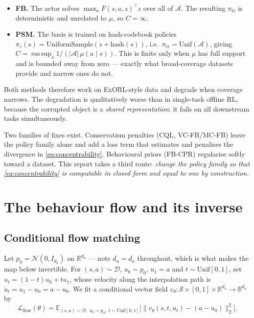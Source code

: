 \documentclass[11pt]{article}
\theoremstyle{plain}
\theoremstyle{definition}
\theoremstyle{remark}
\newcommand{\Sspace}{\mathcal S}
\newcommand{\Aspace}{\mathcal A}
\newcommand{\D}{\mathcal D}
\newcommand{\R}{\mathbb R}
\newcommand{\E}{\mathbb E}
\newcommand{\1}{\mathbf 1}
\begin{document}
\begin{itemize}
\item \textbf{FB.} The actor solves $\max_a F(s,a,z)^\top z$ over all of $\Aspace$. The
  resulting $\pi_{\mathrm{tr}}$ is deterministic and unrelated to $\mu$, so
  $C=\infty$.
\item \textbf{PSM.} The basis is trained on hash-codebook policies
  $\pi_z(s)=\mathrm{UniformSample}(z+\mathrm{hash}(s))$, i.e.\
  $\pi_{\mathrm{tr}}=\mathrm{Unif}(\Aspace)$, giving
  $C=\operatorname*{ess\,sup}_a 1/(|\Aspace|\,\mu(a\mid s))$. This is finite only when
  $\mu$ has full support and is bounded away from zero --- exactly what broad-coverage
  datasets provide and narrow ones do not.
\end{itemize}

\noindent
Both methods therefore work on ExORL-style data and degrade when coverage narrows. The
degradation is qualitatively worse than in single-task offline RL, because the corrupted
object is a \emph{shared representation}: it fails on all downstream tasks
simultaneously.

Two families of fixes exist. Conservatism penalties (CQL, VC-FB/MC-FB) leave the policy
family alone and add a loss term that estimates and penalises the divergence in
\eqref{eq:concentrability}. Behavioural priors (FB-CPR) regularise softly toward a
dataset. This report takes a third route: \emph{change the policy family so that
\eqref{eq:concentrability} is computable in closed form and equal to one by
construction.}

\section{The behaviour flow and its inverse}
\label{sec:flow}

\subsection{Conditional flow matching}

Let $p_0=\mathcal N(0,I_{d_a})$ on $\R^{d_a}$ --- note $d_u = d_a$ throughout, which is
what makes the map below invertible. For $(s,a)\sim\D$, $u_0\sim p_0$, $u_1=a$ and
$t\sim\mathrm{Unif}[0,1]$, set $u_t=(1-t)u_0+tu_1$, whose velocity along the interpolation
path is $\dot u_t=u_1-u_0=a-u_0$. We fit a conditional vector field
$v_\theta:\Sspace\times[0,1]\times\R^{d_a}\to\R^{d_a}$ by
\begin{equation}
\label{eq:flow-loss}
  \mathcal L_{\mathrm{flow}}(\theta)=
  \E_{(s,a)\sim\D,\;u_0\sim p_0,\;t\sim\mathrm{Unif}[0,1]}
  \Big[\big\|v_\theta(s,t,u_t)-(a-u_0)\big\|_2^2\Big].
\end{equation}
\end{document}
